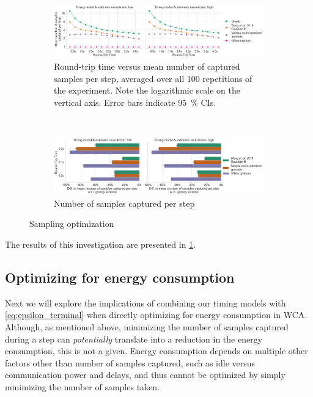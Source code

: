 \begin{figure}
    \centering
    \begin{subfigure}[t]{\textwidth}
        \centering
        \includegraphics[width=\textwidth]{figs/new_model/sampling_optimization.png}
        \caption{%
            Round-trip time versus mean number of captured samples per step, averaged over all \num{100} repetitions of the experiment.
            Note the logarithmic scale on the vertical axis.
            Error bars indicate \SI{95}{\percent} \acp{CI}.
        }
    \end{subfigure}\\
    \medskip
    \begin{subfigure}[t]{\textwidth}
        \centering
        \includegraphics[width=\textwidth]{figs/new_model/sampling_optimization_diff.png}
        \caption{Number of samples captured per step }
    \end{subfigure}
    \caption{Sampling optimization}\label{fig:optimization:samples}
\end{figure}

The results of this investigation are presented in \cref{fig:optimization:samples}.

\subsection{Optimizing for energy consumption}

Next we will explore the implications of combining our timing models with \cref{eq:epsilon_terminal} when directly optimizing for energy consumption in \ac{WCA}.
Although, as mentioned above, minimizing the number of samples captured during a step can \emph{potentially} translate into a reduction in the energy consumption, this is not a given.
Energy consumption depends on multiple other factors other than number of samples captured, such as idle versus communication power and delays, and thus cannot be optimized by simply minimizing the number of samples taken.


